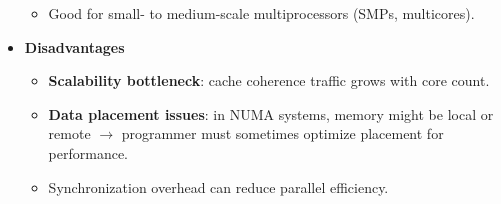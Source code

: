 \begin{itemize}
\begin{itemize}
        \item[\textcolor{Green3}{\faIcon{check}}] Good for small- to medium-scale multiprocessors (SMPs, multicores).
    \end{itemize}
    \newpage
    \item[\textcolor{Red2}{\faIcon{times-circle}}] \textcolor{Red2}{\textbf{Disadvantages}}
    \begin{itemize}
        \item[\textcolor{Red2}{\faIcon{times}}] \textbf{Scalability bottleneck}: cache coherence traffic grows with core count.
        \item[\textcolor{Red2}{\faIcon{times}}] \textbf{Data placement issues}: in NUMA systems, memory might be local or remote $\rightarrow$ programmer must sometimes optimize placement for performance.
        \item[\textcolor{Red2}{\faIcon{times}}] Synchronization overhead can reduce parallel efficiency.
    \end{itemize}
\end{itemize}

